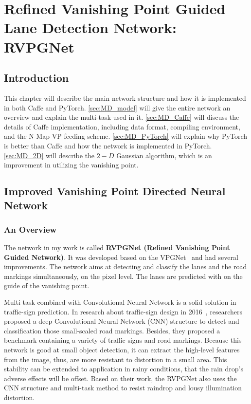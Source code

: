 
\chapter{Refined Vanishing Point Guided Lane Detection Network: RVPGNet}
\label{cha:model}
\begin{spacing}{1.5}
\setlength{\parskip}{0.3in}

\section{Introduction}

This chapter will describe the main network structure and how it is implemented in both Caffe and PyTorch. \autoref{sec:MD_model} will give the entire network an overview and explain the multi-task used in it. \autoref{sec:MD_Caffe} will discuss the details of Caffe implementation, including data format, compiling environment, and the N-Map VP feeding scheme. \autoref{sec:MD_PyTorch} will explain why PyTorch is better than Caffe and how the network is implemented in PyTorch. \autoref{sec:MD_2D} will describe the $2-D$ Gaussian algorithm, which is an improvement in utilizing the vanishing point.

\section{Improved Vanishing Point Directed Neural Network}
\label{sec:MD_model}

\subsection{An Overview}
The network in my work is called \textbf{RVPGNet (Refined Vanishing Point Guided Network)}. It was developed based on the VPGNet~\cite{lee2017vpgnet} and had several improvements. The network aims at detecting and classify the lanes and the road markings simultaneously, on the pixel level. The lanes are predicted with on the guide of the vanishing point. 

Multi-task combined with Convolutional Neural Network is a solid solution in traffic-sign prediction. In research about traffic-sign design in 2016~\cite{zhu2016traffic, huval2015empirical}, researchers proposed a deep Convolutional Neural Network (CNN) structure to detect and classification those small-scaled road markings. Besides, they proposed a benchmark containing a variety of traffic signs and road markings. Because this network is good at small object detection, it can extract the high-level features from the image, thus, are more resistant to distortion in a small area. This stability can be extended to application in rainy conditions, that the rain drop's adverse effects will be offset. Based on their work, the RVPGNet also uses the CNN structure and multi-task method to resist raindrop and lousy illumination distortion.


\end{spacing}
